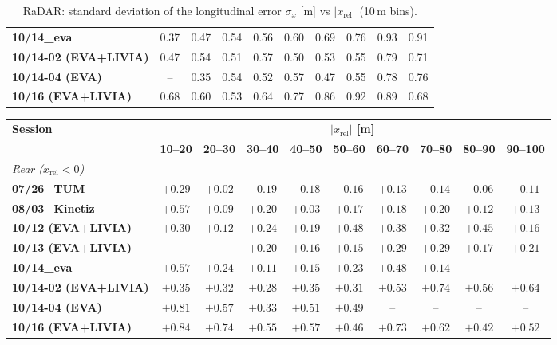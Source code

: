 \begin{table}[H]
\begin{tabular}{|lccccccccc|}
\textbf{10/14\_eva} & 0.37 & 0.47 & 0.54 & 0.56 & 0.60 & 0.69 & 0.76 & 0.93 & 0.91 \\
\textbf{10/14-02 (EVA+LIVIA)} & 0.47 & 0.54 & 0.51 & 0.57 & 0.50 & 0.53 & 0.55 & 0.79 & 0.71 \\
\textbf{10/14-04 (EVA)} & -- & 0.35 & 0.54 & 0.52 & 0.57 & 0.47 & 0.55 & 0.78 & 0.76 \\
\textbf{10/16 (EVA+LIVIA)} & 0.68 & 0.60 & 0.53 & 0.64 & 0.77 & 0.86 & 0.92 & 0.89 & 0.68 \\
\hline
\end{tabular}
\caption{RaDAR: standard deviation of the longitudinal error $\sigma_x$ [m] vs $|x_{\mathrm{rel}}|$ (10\,m bins).}
\label{tab:rad_sx}
\end{table}

\begin{table}[H]
\centering
\setlength{\tabcolsep}{3pt}\footnotesize
\begin{tabular}{|lccccccccc|}
\hline
\rowcolor{bluepoli!40} \textbf{Session} &\multicolumn{9}{c|}{\textbf{$|x_{\mathrm{rel}}|$ [m]}} \\
\cline{2-10}
 \rowcolor{bluepoli!40} & \textbf{10--20} & \textbf{20--30} & \textbf{30--40} & \textbf{40--50} & \textbf{50--60} & \textbf{60--70} & \textbf{70--80} & \textbf{80--90} & \textbf{90--100} \\
\hline\hline
\multicolumn{10}{|l|}{\textit{Rear ($x_{\mathrm{rel}}<0$)}} \\
\textbf{07/26\_TUM} & $+0.29$ & $+0.02$ & $-0.19$ & $-0.18$ & $-0.16$ & $+0.13$ & $-0.14$ & $-0.06$ & $-0.11$ \\
\textbf{08/03\_Kinetiz} & $+0.57$ & $+0.09$ & $+0.20$ & $+0.03$ & $+0.17$ & $+0.18$ & $+0.20$ & $+0.12$ & $+0.13$ \\
\textbf{10/12 (EVA+LIVIA)} & $+0.30$ & $+0.12$ & $+0.24$ & $+0.19$ & $+0.48$ & $+0.38$ & $+0.32$ & $+0.45$ & $+0.16$ \\
\textbf{10/13 (EVA+LIVIA)} & -- & -- & $+0.20$ & $+0.16$ & $+0.15$ & $+0.29$ & $+0.29$ & $+0.17$ & $+0.21$ \\
\textbf{10/14\_eva} & $+0.57$ & $+0.24$ & $+0.11$ & $+0.15$ & $+0.23$ & $+0.48$ & $+0.14$ & -- & -- \\
\textbf{10/14-02 (EVA+LIVIA)} & $+0.35$ & $+0.32$ & $+0.28$ & $+0.35$ & $+0.31$ & $+0.53$ & $+0.74$ & $+0.56$ & $+0.64$ \\
\textbf{10/14-04 (EVA)} & $+0.81$ & $+0.57$ & $+0.33$ & $+0.51$ & $+0.49$ & -- & -- & -- & -- \\
\textbf{10/16 (EVA+LIVIA)} & $+0.84$ & $+0.74$ & $+0.55$ & $+0.57$ & $+0.46$ & $+0.73$ & $+0.62$ & $+0.42$ & $+0.52$ \\

\end{tabular}
\end{table}

